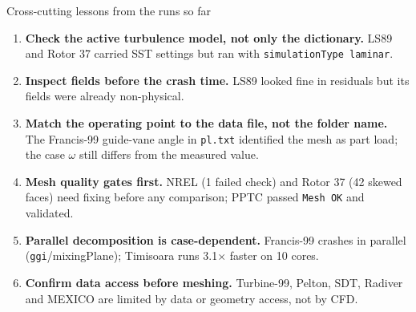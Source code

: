 \documentclass[aspectratio=169,10pt]{beamer}
\begin{document}
\begin{frame}{Cross-cutting lessons from the runs so far}
\small
\begin{enumerate}
\item \textbf{Check the active turbulence model, not only the dictionary.} LS89 and Rotor 37 carried SST settings but ran with \texttt{simulationType laminar}.
\item \textbf{Inspect fields before the crash time.} LS89 looked fine in residuals but its fields were already non-physical.
\item \textbf{Match the operating point to the data file, not the folder name.} The Francis-99 guide-vane angle in \texttt{pl.txt} identified the mesh as part load; the case $\omega$ still differs from the measured value.
\item \textbf{Mesh quality gates first.} NREL (1 failed check) and Rotor 37 (42 skewed faces) need fixing before any comparison; PPTC passed \texttt{Mesh OK} and validated.
\item \textbf{Parallel decomposition is case-dependent.} Francis-99 crashes in parallel (\texttt{ggi}/mixingPlane); Timisoara runs 3.1$\times$ faster on 10 cores.
\item \textbf{Confirm data access before meshing.} Turbine-99, Pelton, SDT, Radiver and MEXICO are limited by data or geometry access, not by CFD.
\end{enumerate}
\end{frame}
\end{document}

